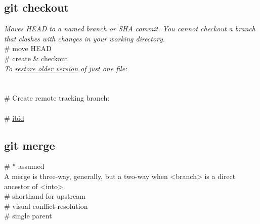 \subsection*{git checkout}
\textit{Moves HEAD to a named branch or SHA commit.  You cannot checkout a branch that clashes with changes in your working directory.}\\
 \# move HEAD \\
 \# create \& checkout \\[2mm]
\textit{To \href{https://stackoverflow.com/questions/215718/how-can-i-reset-or-revert-a-file-to-a-specific-revision}{restore older version} of just one file:}\\
\\
\\[2mm]
\# Create remote tracking branch:\\
 \\
 \# \href{https://stackoverflow.com/questions/3965676/why-did-my-git-repo-enter-a-detached-head-state}{ibid}\\



\subsection*{git merge}
 \# * assumed \\
A merge is three-way, generally, but a two-way  when <branch> is a direct ancestor of <into>.\\ 
 \# shorthand for upstream \\
 \# visual conflict-resolution \\
 \# single parent



